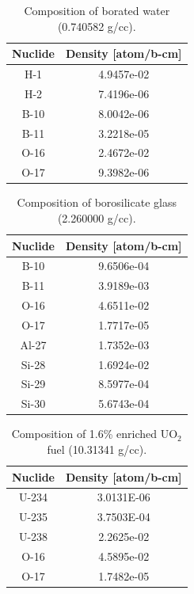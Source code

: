 \begin{appendices}
\begin{table}[h!]
  \centering
  \caption[BEAVRS isotopic composition for borated water]{Composition of borated water (0.740582 g/cc).}
  \footnotesize
  \label{table:chap7-beavrs-isotopes-water}
  \vspace{6pt}
  \begin{tabular}{c c}
  \toprule
  \rowcolor{lightgray}
  {\bf Nuclide} &
  {\bf Density [atom/b-cm]} \\
  \midrule
  H-1 & 4.9457e-02 \\
  H-2 & 7.4196e-06 \\
  B-10 & 8.0042e-06 \\
  B-11 & 3.2218e-05 \\
  O-16 & 2.4672e-02 \\
  O-17 & 9.3982e-06 \\
  \bottomrule
\end{tabular}
\end{table}

\begin{table}[h!]
  \centering
  \caption[BEAVRS isotopic composition for borosilicate glass]{Composition of borosilicate glass (2.260000 g/cc).}
  \footnotesize
  \label{table:chap7-beavrs-isotopes-borosilicate}
  \vspace{6pt}
  \begin{tabular}{c c}
  \toprule
  \rowcolor{lightgray}
  {\bf Nuclide} &
  {\bf Density [atom/b-cm]} \\
  \midrule
  B-10 & 9.6506e-04 \\
  B-11 & 3.9189e-03 \\
  O-16 & 4.6511e-02 \\
  O-17 & 1.7717e-05 \\
  Al-27 & 1.7352e-03 \\
  Si-28 & 1.6924e-02 \\
  Si-29 & 8.5977e-04 \\
  Si-30 & 5.6743e-04 \\
  \bottomrule
\end{tabular}
\end{table}

\begin{table}[h!]
  \centering
  \caption[BEAVRS isotopic composition for 1.6\% enriched UO$_2$]{Composition of 1.6\% enriched UO$_2$ fuel (10.31341 g/cc).}
  \footnotesize
  \label{table:chap7-beavrs-isotopes-1.6-uo2}
  \vspace{6pt}
  \begin{tabular}{c c}
  \toprule
  \rowcolor{lightgray}
  {\bf Nuclide} &
  {\bf Density [atom/b-cm]} \\
  \midrule
  U-234 & 3.0131E-06 \\
  U-235 & 3.7503E-04 \\
  U-238 & 2.2625e-02 \\
  O-16 & 4.5895e-02 \\
  O-17 & 1.7482e-05 \\
  \bottomrule
\end{tabular}
\end{table}


\end{appendices}
